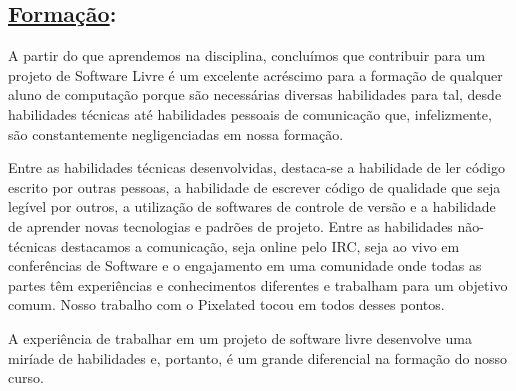 \subsection*{\underline{Formação}:}

A partir do que aprendemos na disciplina, concluímos que contribuir para um
projeto de Software Livre é um excelente acréscimo para a formação de qualquer
aluno de computação porque são necessárias diversas habilidades para tal, desde
habilidades técnicas até habilidades pessoais de comunicação que, infelizmente,
são constantemente negligenciadas em nossa formação.

Entre as habilidades técnicas desenvolvidas, destaca-se a habilidade de ler
código escrito por outras pessoas, a habilidade de escrever código de qualidade
que seja legível por outros, a utilização de softwares de controle de versão e a
habilidade de aprender novas tecnologias e padrões de projeto. Entre as
habilidades não-técnicas destacamos a comunicação, seja online pelo IRC, seja ao
vivo em conferências de Software e o engajamento em uma comunidade onde todas as
partes têm experiências e conhecimentos diferentes e trabalham para um objetivo
comum. Nosso trabalho com o Pixelated tocou em todos desses pontos.

A experiência de trabalhar em um projeto de software livre desenvolve uma
miríade de habilidades e, portanto, é um grande diferencial na formação do
nosso curso.
